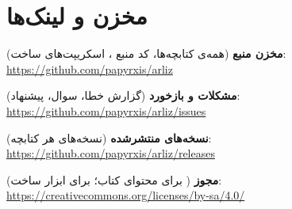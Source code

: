 \chapter*{مخزن و لینک‌ها}

\noindent\textbf{مخزن منبع} (همه‌ی کتابچه‌ها، کد منبع ، اسکریپت‌های ساخت):\\
\url{https://github.com/papyrxis/arliz}

\medskip

\noindent\textbf{مشکلات و بازخورد} (گزارش خطا، سوال، پیشنهاد):\\
\url{https://github.com/papyrxis/arliz/issues}

\medskip

\noindent\textbf{نسخه‌های منتشرشده} (نسخه‌های  هر کتابچه):\\
\url{https://github.com/papyrxis/arliz/releases}

\medskip

\noindent\textbf{مجوز} ( برای محتوای کتاب؛  برای ابزار ساخت):\\
\url{https://creativecommons.org/licenses/by-sa/4.0/}